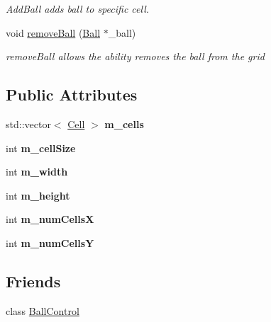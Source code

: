 \begin{DoxyCompactItemize}
\begin{DoxyCompactList}\small\item\em AddBall adds ball to specific cell. \item\end{DoxyCompactList}\item 
void \hyperlink{classBallGrid_a1a1787d7850c2639e92492f8301e14fb}{removeBall} (\hyperlink{structBall}{Ball} $\ast$\_\-ball)
\begin{DoxyCompactList}\small\item\em removeBall allows the ability removes the ball from the grid \item\end{DoxyCompactList}\end{DoxyCompactItemize}
\subsection*{Public Attributes}
\begin{DoxyCompactItemize}
\item 
\hypertarget{classBallGrid_a1784f4acd2d7dda8cf47b52ff9869416}{
std::vector$<$ \hyperlink{structCell}{Cell} $>$ {\bfseries m\_\-cells}}
\label{classBallGrid_a1784f4acd2d7dda8cf47b52ff9869416}

\item 
\hypertarget{classBallGrid_a27151691c66dab33adb36622089294c0}{
int {\bfseries m\_\-cellSize}}
\label{classBallGrid_a27151691c66dab33adb36622089294c0}

\item 
\hypertarget{classBallGrid_a0b9fc1fe2f4465113fcf968523a7f8ae}{
int {\bfseries m\_\-width}}
\label{classBallGrid_a0b9fc1fe2f4465113fcf968523a7f8ae}

\item 
\hypertarget{classBallGrid_ada7cfe8e209b93cca5329b048b1dc0a3}{
int {\bfseries m\_\-height}}
\label{classBallGrid_ada7cfe8e209b93cca5329b048b1dc0a3}

\item 
\hypertarget{classBallGrid_afa477104004a39645546c48c8fe891b6}{
int {\bfseries m\_\-numCellsX}}
\label{classBallGrid_afa477104004a39645546c48c8fe891b6}

\item 
\hypertarget{classBallGrid_a47e202910b6408d75837fa8f9e99e82a}{
int {\bfseries m\_\-numCellsY}}
\label{classBallGrid_a47e202910b6408d75837fa8f9e99e82a}

\end{DoxyCompactItemize}
\subsection*{Friends}
\begin{DoxyCompactItemize}
\item 
\hypertarget{classBallGrid_a96c3892ebe4274ff47fade92c0bf313f}{
class \hyperlink{classBallGrid_a96c3892ebe4274ff47fade92c0bf313f}{BallControl}}
\label{classBallGrid_a96c3892ebe4274ff47fade92c0bf313f}

\end{DoxyCompactItemize}



